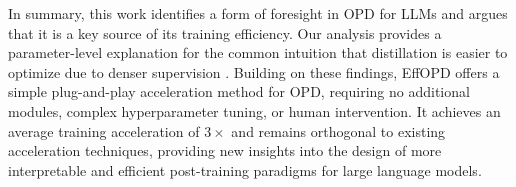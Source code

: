 \documentclass{article}
\begin{document}
In summary, this work identifies a form of foresight in OPD for LLMs and argues that it is a key source of its training efficiency. Our analysis provides a parameter-level explanation for the common intuition that distillation is easier to optimize due to denser supervision \citep{Yang2026LearningBT}. Building on these findings, EffOPD offers a simple plug-and-play acceleration method for OPD, requiring no additional modules, complex hyperparameter tuning, or human intervention. It achieves an average training acceleration of $3\times$ and remains orthogonal to existing acceleration techniques, providing new insights into the design of more interpretable and efficient post-training paradigms for large language models.




\end{document}
